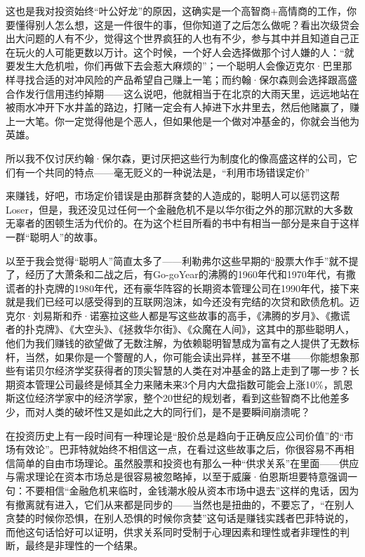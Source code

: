 这也是我对投资始终``叶公好龙''的原因，这确实是一个高智商+高情商的工作，你要懂得别人怎么想，这是一件很牛的事，但你知道了之后怎么做呢？看出次级贷会出大问题的人有不少，觉得这个世界疯狂的人也有不少，参与其中并且知道自己正在玩火的人可能更数以万计。这个时候，一个好人会选择做那个讨人嫌的人：``就要发生大危机啦，你们再做下去会惹大麻烦的''；一个聪明人会像迈克尔·巴里那样寻找合适的对冲风险的产品希望自己赚上一笔；而约翰·保尔森则会选择跟高盛合作发行信用违约掉期------这么说吧，他就相当于在北京的大雨天里，远远地站在被雨水冲开下水井盖的路边，打赌一定会有人掉进下水井里去，然后他赌赢了，赚上一大笔。你一定觉得他是个恶人，但如果他是一个做对冲基金的，你就会当他为英雄。

所以我不仅讨厌约翰·保尔森，更讨厌把这些行为制度化的像高盛这样的公司，它们有一个共同的特点------毫无贬义的一种说法是，``利用市场错误定价''

来赚钱，好吧，市场定价错误是由那群贪婪的人造成的，聪明人可以惩罚这帮Loser，但是，我还没见过任何一个金融危机不是以华尔街之外的那沉默的大多数无辜者的困顿生活为代价的。在为这个栏目所看的书中有相当一部分是来自于这样一群``聪明人''的故事。

以至于我会觉得``聪明人''简直太多了------利勒弗尔这些早期的``股票大作手''就不提了，经历了大萧条和二战之后，有Go-goYear的沸腾的1960年代和1970年代，有撒谎者的扑克牌的1980年代，还有豪华阵容的长期资本管理公司在1990年代，接下来就是我们已经可以感受得到的互联网泡沫，如今还没有完结的次贷和欧债危机。迈克尔·刘易斯和乔·诺塞拉这些人都是写这些故事的高手，《沸腾的岁月》、《撒谎者的扑克牌》、《大空头》、《拯救华尔街》、《众魔在人间》，这其中的那些聪明人，他们为我们赚钱的欲望做了无数注解，为依赖聪明智慧成为富有之人提供了无数标杆，当然，如果你是一个警醒的人，你可能会读出异样，甚至不堪------你能想象那些有诺贝尔经济学奖获得者的顶尖智慧的人类在对冲基金的路上走到了哪一步？长期资本管理公司最终是倾其全力来赌未来3个月内大盘指数可能会上涨10\%，凯恩斯这位经济学家中的经济学家，整个20世纪的规划者，看到这些智商不比他差多少，而对人类的破坏性又是如此之大的同行们，是不是要瞬间崩溃呢？

在投资历史上有一段时间有一种理论是``股价总是趋向于正确反应公司价值''的``市场有效论''。巴菲特就始终不相信这一点，在看过这些故事之后，你很容易不再相信简单的自由市场理论。虽然股票和投资也有那么一种``供求关系''在里面------供应与需求理论在资本市场总是很容易被忽略掉，以至于威廉·伯恩斯坦要特意强调一句：不要相信``金融危机来临时，金钱潮水般从资本市场中退去''这样的鬼话，因为有撤离就有进入，它们从来都是同步的------当然也是扭曲的，不要忘了，``在别人贪婪的时候你恐惧，在别人恐惧的时候你贪婪''这句话是赚钱实践者巴菲特说的，而他这句话恰好可以证明，供求关系同时受制于心理因素和理性或者非理性的判断，最终是非理性的一个结果。

